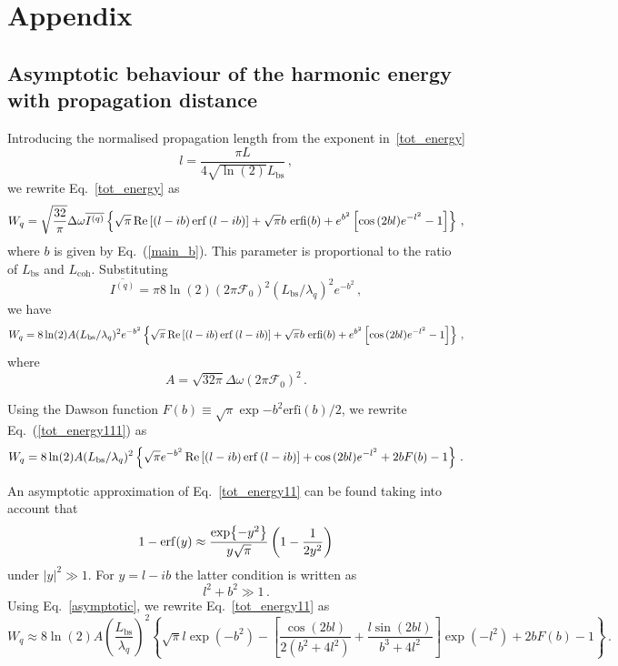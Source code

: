 %
\section*{Appendix}
%
\subsection{Asymptotic behaviour of the harmonic energy with propagation distance}
%
Introducing the normalised propagation length from the exponent in~\eqref{tot_energy}
\begin{equation}
l= \frac{\pi L}{4\sqrt{ \ln(2)} L_\mathrm{bs}} \, ,
    \label{l}
\end{equation}
we rewrite Eq.~\eqref{tot_energy} as
\begin{equation}
W_q = \sqrt{\frac{32}{\pi}} \Delta \omega \overline{I^{(q)}} 
\left\{    
\sqrt{\pi}     \Re{ \left[ (l - i b) \erf{(l - i b)}\right] } + \sqrt{\pi} b \ \mathrm{erfi} {(b)} + e^{b^2} \left[ \cos{(2bl)} e^{-l^2} -1  \right]    
\right\} \, ,
   \label{tot_energy1}
\end{equation}
where $b$ is given by Eq.~(\ref{main_b}). This parameter is proportional to the ratio of $L_\mathrm{bs}$ and $L_\mathrm{coh}$. Substituting 
$$
\overline{I^{(q)}}= \pi 8 \ln (2) (2 \pi \mathcal{F}_0)^2 (L_\mathrm{bs}/ \lambda_q)^2 e^{-b^2} \, ,
$$
we have 
\begin{equation}
W_q = 8 \ln (2) A (L_\mathrm{bs}/ \lambda_q)^2 e^{-b^2}
\left\{    
\sqrt{\pi}     \Re{ \left[ (l - i b) \erf{(l - i b)}\right] } + \sqrt{\pi} b \ \mathrm{erfi} {(b)} + e^{b^2} \left[ \cos{(2bl)} e^{-l^2} -1  \right]    
\right\} \, ,
   \label{tot_energy111}
\end{equation}
where
$$
A=\sqrt{32\pi} \Delta \omega (2 \pi \mathcal{F}_0)^2 \, .
$$

Using the Dawson function $F(b) \equiv \sqrt{\pi} \exp{-b^2} \mathrm{erfi}( b)  /2$, we rewrite Eq.~(\ref{tot_energy111}) as
\begin{equation}
W_q = 8 \ln (2) A (L_\mathrm{bs}/ \lambda_q)^2 
\left\{    
\sqrt{\pi} e^{-b^2}    \Re{ \left[ (l - i b) \erf{(l - i b)}\right] } + \cos{(2bl)} e^{-l^2} + 2 b  F(b) -1  \right\} \, .
   \label{tot_energy11}
\end{equation}

An asymptotic approximation of Eq.~\eqref{tot_energy11} can be found taking into account that 
\begin{equation}
1-\erf(y)\approx \frac{\exp{-y^2}}{ y \sqrt{\pi} }\left( 1-\frac{1}{2 y^2}\right)
\label{asymptotic}
\end{equation}
under $|y|^2 \gg 1$. For $y=l-ib$ the latter condition is written as 
\begin{equation}
    l^2 + b^2\gg 1 \, .
    \label{condition2}
\end{equation}
Using Eq.~\eqref{asymptotic}, we rewrite Eq.~\eqref{tot_energy11} as
\begin{equation}
W_q \approx 8 \ln(2) A\left( \frac{L_\mathrm{bs}}{\lambda_q}\right)^2
\left\{ \sqrt{\pi} l \exp(-b^2)-\left[ \frac{\cos(2 b l)}{2(b^2+4 l^2)}+ \frac{l \sin(2 b l)}{b^3+4 l^2}\right] \exp(-l^2) +2 b F(b)-1\right\} \, .
\label{tot_energy_long_L}
\end{equation}

